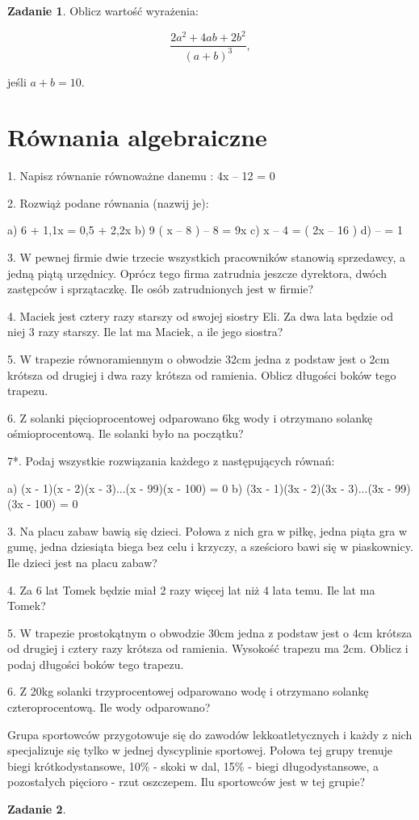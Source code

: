 \documentclass[11pt]{article}
\theoremstyle{definition}
\newtheorem{zad}{Zadanie}
\numberwithin{zad}{section}
\begin{document}
\begin{zad}
Oblicz wartość wyrażenia:

$$\frac{2a^2+4ab+2b^2}{(a+b)^3},$$

jeśli $a+b=10$.
\end{zad}

\section{Równania algebraiczne}

1. Napisz równanie równoważne danemu : 4x – 12 = 0

2. Rozwiąż podane równania (nazwij je):

a) 6 + 1,1x = 0,5 + 2,2x
 b) 9 ( x – 8 ) – 8 = 9x
c) x – 4 = ( 2x – 16 ) d) – = 1

3. W pewnej firmie dwie trzecie wszystkich pracowników stanowią sprzedawcy, a jedną piątą urzędnicy. Oprócz tego firma zatrudnia jeszcze dyrektora, dwóch zastępców i sprzątaczkę. Ile osób zatrudnionych jest w firmie?

4. Maciek jest cztery razy starszy od swojej siostry Eli. Za dwa lata będzie od niej 3 razy starszy. Ile lat ma Maciek, a ile jego siostra?

5. W trapezie równoramiennym o obwodzie 32cm jedna z podstaw jest o 2cm krótsza od drugiej i dwa razy krótsza od ramienia. Oblicz długości boków tego trapezu.

6. Z solanki pięcioprocentowej odparowano 6kg wody i otrzymano solankę ośmioprocentową. Ile solanki było na początku?


7*. Podaj wszystkie rozwiązania każdego z następujących równań:

a) (x - 1)(x - 2)(x - 3)...(x - 99)(x - 100) = 0 b) (3x - 1)(3x - 2)(3x - 3)...(3x - 99)(3x - 100) = 0



3. Na placu zabaw bawią się dzieci. Połowa z nich gra w piłkę, jedna piąta gra w gumę, jedna dziesiąta biega bez celu i krzyczy, a sześcioro bawi się w piaskownicy. Ile dzieci jest na placu zabaw?


4. Za 6 lat Tomek będzie miał 2 razy więcej lat niż 4 lata temu. Ile lat ma Tomek?

5. W trapezie prostokątnym o obwodzie 30cm jedna z podstaw jest o 4cm krótsza od drugiej i cztery razy krótsza od ramienia. Wysokość trapezu ma 2cm. Oblicz i podaj długości boków tego trapezu.

6. Z 20kg solanki trzyprocentowej odparowano wodę i otrzymano solankę czteroprocentową. Ile wody odparowano?

Grupa sportowców przygotowuje się do zawodów lekkoatletycznych i każdy z nich specjalizuje się tylko w jednej dyscyplinie sportowej. Połowa tej grupy trenuje biegi krótkodystansowe, 10\% - skoki w dal, 15\% - biegi długodystansowe, a pozostałych pięcioro - rzut oszczepem. Ilu sportowców jest w tej grupie?

\begin{zad}
\end{zad}
\end{document}
